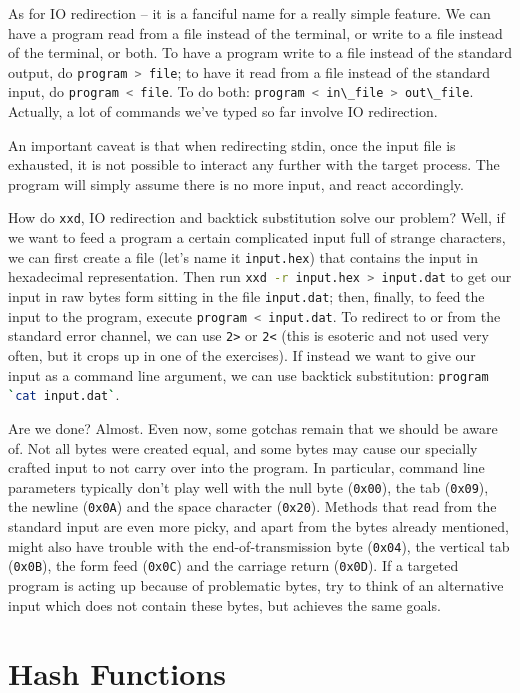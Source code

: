 \documentclass{article}
\newcommand{\xcode}[2]{\colorbox{ubuntuback}{\lstinline[language=#1]|#2|}}
\newcommand{\code}[1]{\colorbox{ubuntuback}{\texttt{#1}}}
\begin{document}
As for IO redirection -- it is a fanciful name for a really simple feature. We can have a program read from a file instead of the terminal, or write to a file instead of the terminal, or both. To have a program write to a file instead of the standard output, do \xcode{bash}{program > file}; to have it read from a file instead of the standard input, do \xcode{bash}{program < file}. To do both: \xcode{bash}{program < in\_file > out\_file}. Actually, a lot of commands we've typed so far involve IO redirection.

An important caveat is that when redirecting stdin, once the input file is exhausted, it is not possible to interact any further with the target process. The program will simply assume there is no more input, and react accordingly.

How do \code{xxd}, IO redirection and backtick substitution solve our problem? Well, if we want to feed a program a certain complicated input full of strange characters, we can first create a file (let's name it \code{input.hex}) that contains the input in hexadecimal representation. Then run \xcode{bash}{xxd -r input.hex > input.dat} to get our input in raw bytes form sitting in the file \code{input.dat}; then, finally, to feed the input to the program, execute \xcode{bash}{program < input.dat}.  To redirect to or from the standard error channel, we can use \code{2>} or \code{2<} (this is esoteric and not used very often, but it crops up in one of the exercises). If instead we want to give our input as a command line argument, we can use backtick substitution: \xcode{bash}{program `cat input.dat`}.

Are we done? Almost. Even now, some gotchas remain that we should be aware of. Not all bytes were created equal, and some bytes may cause our specially crafted input to not carry over into the program. In particular, command line parameters typically don't play well with the null byte (\code{0x00}), the tab (\code{0x09}), the newline (\code{0x0A}) and the space character (\code{0x20}). Methods that read from the standard input are even more picky, and apart from the bytes already mentioned, might also have trouble with the end-of-transmission byte (\code{0x04}), the vertical tab (\code{0x0B}), the form feed (\code{0x0C}) and the carriage return (\code{0x0D}). If a targeted program is acting up because of problematic bytes, try to think of an alternative input which does not contain these bytes, but achieves the same goals.

\section{Hash Functions}
\end{document}
